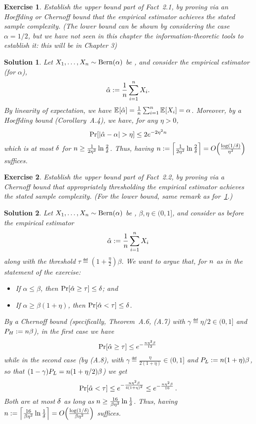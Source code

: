 \documentclass[biber]{nowfnt} %
\newtheorem{question}{Exercise}[chapter]
\newtheorem{solution}{Solution}[chapter]
\begin{document}
\begin{question}\label{ex:uniformity:bias:coin}
  Establish the upper bound part of Fact~2.1, by proving \textit{via} an Hoeffding or Chernoff bound that the empirical estimator achieves the stated sample complexity. (The lower bound can be shown by considering the case $\alpha=1/2$, but we have not seen in this chapter the information-theoretic tools to establish it: this will be in Chapter 3)
\end{question}
\begin{solution}
Let $X_1,\dots, X_n \sim \operatorname{Bern}( \alpha ) $ be \iid, and consider the empirical estimator (for $\alpha$), 
\[
	\hat{\alpha} := \frac{1}{n}\sum_{i=1}^n X_i.
\]
By linearity of expectation, we have $\bEE{\hat{\alpha}} = \frac{1}{\ns}\sum_{i=1}^\ns \bEE{X_i} = \alpha$. Moreover, by a Hoeffding bound (Corollary~A.4), we have, for any $\eta>0$,
\[
	\bPr{\abs{\hat{\alpha} - \alpha}> \eta} \leq 2e^{-2\eta^2 \ns}
\]
which is at most $\delta$ for
 $n \geq \frac{1}{2\eta^2}\ln\frac{2}{\delta}$. Thus, having $\ns \eqdef \clg{\frac{1}{2\eta^2}\ln\frac{2}{\errprob}} = \bigO{\frac{\log(1/\errprob)}{\eta^2}}$ suffices.

\end{solution}
\begin{question}\label{ex:uniformity:bias:coin:testing}
  Establish the upper bound part of Fact~2.2, by proving \textit{via} a Chernoff bound that appropriately thresholding the empirical estimator achieves the stated sample complexity. (For the lower bound, same remark as for~\cref{ex:uniformity:bias:coin}.)
\end{question}
\begin{solution}
Let $X_1,\dots, X_n \sim \operatorname{Bern}( \alpha ) $ be \iid, $\beta,\eta\in(0,1]$, and consider as before the empirical estimator
\[
	\hat{\alpha} := \frac{1}{n}\sum_{i=1}^n X_i
\]
along with the threshold $\tau \eqdef (1+\frac{\eta}{2})\beta$. We want to argue that, for $n$ as in the statement of the exercise:
\begin{itemize}
	\item If $\alpha \leq \beta$, then $\bPr{\hat{\alpha} \geq \tau} \leq \errprob$; and
	\item If $\alpha \geq \beta(1+\eta)$, then $\bPr{\hat{\alpha} < \tau} \leq \errprob$.
\end{itemize}
By a Chernoff bound (specifically, Theorem~A.6, (A.7) with $\gamma \eqdef \eta/2\in(0,1]$ and $P_H := n\beta$), in the first case we have
\[
	\bPr{\hat{\alpha} \geq \tau} \leq e^{-\frac{\ns\eta^2\beta}{12}}\,
\]
while in the second case (by (A.8), with $\gamma \eqdef \frac{\eta}{2(1+\eta)}\in(0,1]$ and $P_L := n(1+\eta)\beta$, so that $(1-\gamma)P_L = n(1+\eta/2)\beta$) we get
\[
	\bPr{\hat{\alpha} < \tau} \leq e^{-\frac{\ns\eta^2\beta}{4(1+\eta)^2}}
	\leq e^{-\frac{\ns\eta^2\beta}{16}}\,.
\]
Both are at most $\delta$ as long as $n \geq \frac{16}{\beta\eta^2}\ln \frac{1}{\delta}$. Thus, having $\ns \eqdef \clg{\frac{16}{\beta\eta^2}\ln\frac{1}{\errprob}} = \bigO{\frac{\log(1/\errprob)}{\beta\eta^2}}$ suffices.
\end{solution}
\end{document}
